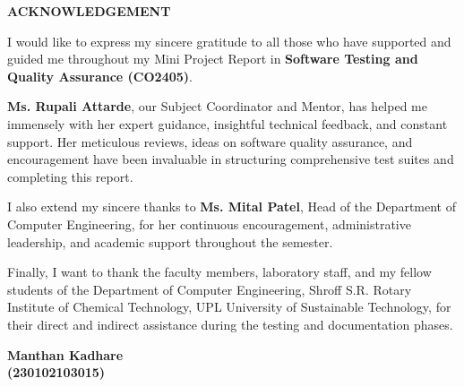 \documentclass{InternshipReport}
\begin{document}
\clearpage
\thispagestyle{empty}
\begin{center}
    \vspace*{10mm}
    {\fontsize{16}{20}\selectfont\textbf{ACKNOWLEDGEMENT}\par}
\end{center}

\vspace{12mm}
\noindent
I would like to express my sincere gratitude to all those who have supported and guided me throughout my Mini Project Report in \textbf{Software Testing and Quality Assurance (CO2405)}.

\vspace{5mm}
\noindent
\textbf{Ms. Rupali Attarde}, our Subject Coordinator and Mentor, has helped me immensely with her expert guidance, insightful technical feedback, and constant support. Her meticulous reviews, ideas on software quality assurance, and encouragement have been invaluable in structuring comprehensive test suites and completing this report.

\vspace{5mm}
\noindent
I also extend my sincere thanks to \textbf{Ms. Mital Patel}, Head of the Department of Computer Engineering, for her continuous encouragement, administrative leadership, and academic support throughout the semester.

\vspace{5mm}
\noindent
Finally, I want to thank the faculty members, laboratory staff, and my fellow students of the Department of Computer Engineering, Shroff S.R. Rotary Institute of Chemical Technology, UPL University of Sustainable Technology, for their direct and indirect assistance during the testing and documentation phases.

\vspace{35mm}
\begin{flushright}
    \textbf{Manthan Kadhare}\\[2mm]
    \textbf{(230102103015)}
\end{flushright}

\clearpage
\pagestyle{prechapter}
\tableofcontents

\clearpage
\listoftables
\end{document}
